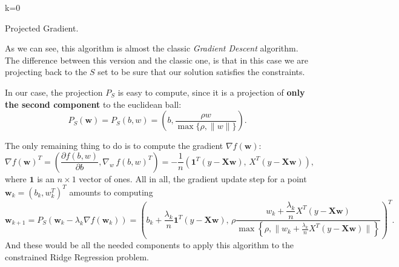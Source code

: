 \documentclass[11pt,table]{article}
\begin{document}
	\begin{algorithm}[H]
		\SetNoFillComment
		\SetAlgoLined
		\DontPrintSemicolon
		k=0\;
		\caption{Projected Gradient.}
	\end{algorithm}
	
	As we can see, this algorithm is almost the classic \emph{Gradient Descent} algorithm. The difference between this version and the classic one, is that in this case we are projecting back to the \(S\) set to be sure that our solution satisfies the constraints.
	
	In our case, the projection \(P_S\) is easy to compute, since it is a projection of \textbf{only the second component} to the euclidean ball:
	\[
	P_S(\mathbf{w}) = P_S(b, w) = \left(b, \frac{\rho w}{\max\{\rho, \|w\|\}}\right).
	\]
	
	The only remaining thing to do is to compute the gradient $\nabla f(\mathbf{w})$:
	\[
	\nabla f(\mathbf{w})^T = \left(\frac{\partial f(b, w)}{\partial b}, \nabla_w \, f(b, w)^T \right) =  -\frac{1}{n}\left(\boldsymbol{1}^T(y-\mathbf{X}\mathbf{w}), \, X^T(y-\mathbf{X}\mathbf{w})\right),
	\]
	where $\boldsymbol{1}$ is an $n\times 1$ vector of ones. All in all, the gradient update step for a point $\mathbf{w}_k = (b_k, w_k^T)^T$ amounts to computing
	\[
	\mathbf{w}_{k+1} = P_S(\mathbf{w}_k-\lambda_k\nabla f(\mathbf{w}_k)) = \left(b_k + \frac{\lambda_k}{n} \boldsymbol{1}^T(y-\mathbf{X}\mathbf{w}), \, \rho \frac{w_k + \dfrac{\lambda_k}{n} X^T(y-\mathbf{X}\mathbf{w})}{\max \left\{ \rho, \|w_k + \frac{\lambda_k}{n} X^T(y-\mathbf{X} \mathbf{w})\|\right\}} \right)^T.
	\]
	And these would be all the needed components to apply this algorithm to the constrained Ridge Regression problem.
	
	
\end{document}
